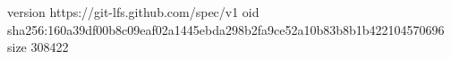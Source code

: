 version https://git-lfs.github.com/spec/v1
oid sha256:160a39df00b8c09eaf02a1445ebda298b2fa9ce52a10b83b8b1b422104570696
size 308422
